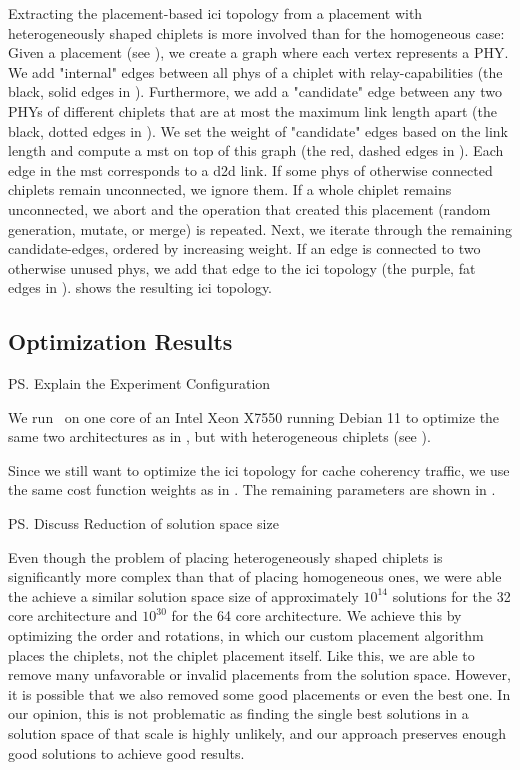 Extracting the placement-based \gls{ici} topology from a placement with heterogeneously shaped chiplets is more involved than for the homogeneous case: 
Given a placement (see ), we create a graph where each vertex represents a PHY.	
We add "internal" edges between all \gls{phys} of a chiplet with relay-capabilities (the black, solid edges in ).
Furthermore, we add a "candidate" edge between any two PHYs of different chiplets that are at most the maximum link length apart (the black, dotted edges in ).
We set the weight of "candidate" edges based on the link length and compute a \gls{mst} \cite{mst} on top of this graph (the red, dashed edges in ).
Each edge in the \gls{mst} corresponds to a \gls{d2d} link.
If some \gls{phys} of otherwise connected chiplets remain unconnected, we ignore them.	
If a whole chiplet remains unconnected, we abort and the operation that created this placement (random generation, mutate, or merge) is repeated.
Next, we iterate through the remaining candidate-edges, ordered by increasing weight.
If an edge is connected to two otherwise unused \gls{phys}, we add that edge to the \gls{ici} topology (the purple, fat edges in ).
 shows the resulting 	\gls{ici} topology.

\subsection{Optimization Results}
\label{ssec:hetero-opt}

\ps{Explain the Experiment Configuration}

We run \name~on one core of an Intel Xeon X7550 running Debian 11 to optimize the same two architectures as in , but with heterogeneous chiplets (see ).



Since we still want to optimize the \gls{ici} topology for cache coherency traffic, we use the same cost function weights as in .
The remaining parameters are shown in .



\ps{Discuss Reduction of solution space size}

Even though the problem of placing heterogeneously shaped chiplets is significantly more complex than that of placing homogeneous ones, we were able the achieve a similar solution space size of approximately $10^{14}$ solutions for the 32 core architecture and $10^{30}$ for the 64 core architecture.
We achieve this by optimizing the order and rotations, in which our custom placement algorithm places the chiplets, not the chiplet placement itself.
Like this, we are able to remove many unfavorable or invalid placements from the solution space.
However, it is possible that we also removed some good placements or even the best one.
In our opinion, this is not problematic as finding the single best solutions in a solution space of that scale is highly unlikely, and our approach preserves enough good solutions to achieve good results.

